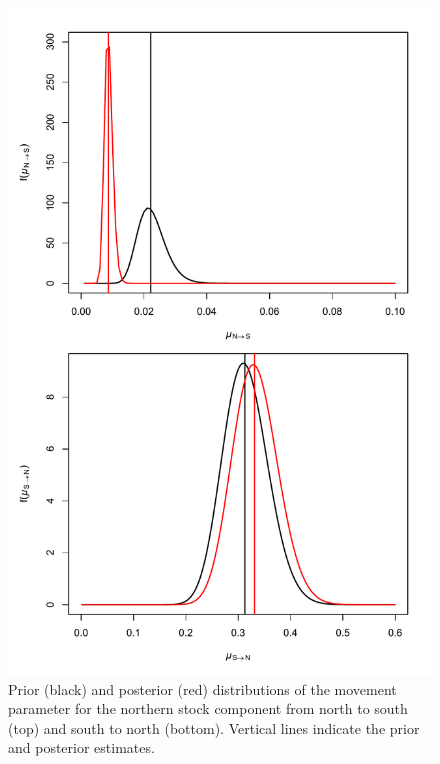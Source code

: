 \documentclass[
]{article}
\begin{document}
\begin{figure}

{\centering \includegraphics[width=1\linewidth]{move_prior_post} 

}

\caption{Prior (black) and posterior (red) distributions of the movement parameter for the northern stock component from north to south (top) and south to north (bottom). Vertical lines indicate the prior and posterior estimates.}\label{fig:move-prior-posterior}
\end{figure}
\pagebreak
\end{document}
